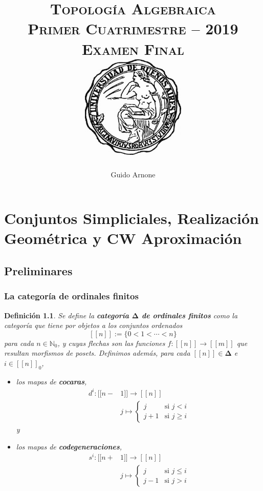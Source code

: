 \documentclass[11pt]{report}
\title{
\scshape\Huge{Topología Algebraica}
\\
\vspace{3pt}
\Large{Primer Cuatrimestre -- 2019}
\\
\vspace{0.5pt}
\Large{Examen Final}
\\
\vspace{80pt}
{\includegraphics[height=5cm]{uba2.jpg}}
\vspace{80pt}
}
\author{\Large Guido Arnone}
\date{}
\theoremstyle{colored}
\newtheorem{definition}{Definición}[section]
\newcommand{\N}{\mathbb{N}}
\newcommand{\nat}[1]{[\![#1]\!]}
\newcommand{\ord}[1]{\nat{#1}}
\newcommand{\natzero}[1]{\nat{#1}_0}
\newcommand{\ordcat}{\boldsymbol{\Delta}}
\begin{document}
\maketitle
\renewcommand{\contentsname}{Índice}
\tableofcontents
\chapter{Conjuntos Simpliciales, Realización Geométrica y CW Aproximación}

\section{Preliminares}


\subsection{La categoría de ordinales finitos}

\begin{definition} Se define la \textbf{categoría $\ordcat$ de ordinales finitos} como la categoría que tiene por objetos a los conjuntos ordenados
\[
\ord{n} := \{0 < 1 < \cdots < n\}
\]
para cada $n \in \N_0$, y cuyas flechas son las funciones $f : \ord{n} \to \ord{m}$ que resultan morfismos de posets. Definimos además, para cada $\ord{n} \in \ordcat$ e $i \in \natzero{n}$, 
\begin{itemize}
\item los mapas de \textbf{cocaras},
\begin{align*}
d^i : \ord{n-&1} \to \ord{n}\\
&j \mapsto \begin{cases}
j &\text{si $j < i$}\\
j+1 &\text{si $j \geq i$}
\end{cases}
\end{align*}
y
\item los mapas de \textbf{codegeneraciones},
\begin{align*}
s^i : \ord{n+&1} \to \ord{n}\\
&j \mapsto \begin{cases}
j &\text{si $j \leq i$}\\
j-1 &\text{si $j > i$}
\end{cases}
\end{align*}
\end{itemize} 
\end{definition}
\end{document}
